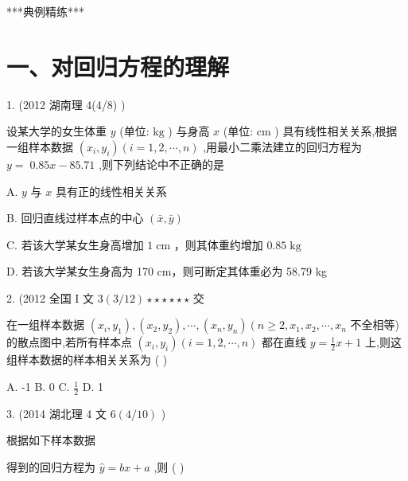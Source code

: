 \documentclass[10pt]{article}
\begin{document}
***典例精练***

\section*{一、对回归方程的理解}

1. (2012 湖南理 4(4/8)            )

设某大学的女生体重 \(y\) (单位: \(\mathrm{{kg}}\) ) 与身高 \(x\) (单位: \(\mathrm{{cm}}\) ) 具有线性相关关系,根据一组样本数据 \(\left( {{x}_{i},{y}_{i}}\right) \left( {i = 1,2,\cdots ,n}\right)\) ,用最小二乘法建立的回归方程为 \(y = \; {0.85x} - {85.71}\) ,则下列结论中不正确的是

A. \(y\) 与 \(x\) 具有正的线性相关关系

B. 回归直线过样本点的中心 \(\left( {\bar{x},\bar{y}}\right)\)

C. 若该大学某女生身高增加 \(1\mathrm{\;{cm}}\) ，则其体重约增加 \({0.85}\mathrm{\;{kg}}\)

D. 若该大学某女生身高为 170 cm，则可断定其体重必为 58.79 kg

2. (2012 全国 I 文 \(3\left( {3/{12}}\right)  \star   \star   \star   \star   \star   \star\) 交

在一组样本数据 \(\left( {{x}_{i},{y}_{1}}\right) ,\left( {{x}_{2},{y}_{2}}\right) ,\cdots ,\left( {{x}_{n},{y}_{n}}\right) \left( {n \geq  2,{x}_{1},{x}_{2},\cdots ,{x}_{n}}\right.\) 不全相等) 的散点图中,若所有样本点 \(\left( {{x}_{i},{y}_{i}}\right) \left( {i = 1,2,\cdots ,n}\right)\) 都在直线 \(y = \frac{1}{2}x + 1\) 上,则这组样本数据的样本相关关系为 ( )

A. -1 B. 0 C. \(\frac{1}{2}\) D. 1

3. (2014 湖北理 4 文 \(6\left( {4/{10}}\right)\)           )

根据如下样本数据

\begin{center}
\end{center}

得到的回归方程为 \(\widehat{y} = {bx} + a\) ,则 ( )
\end{document}
